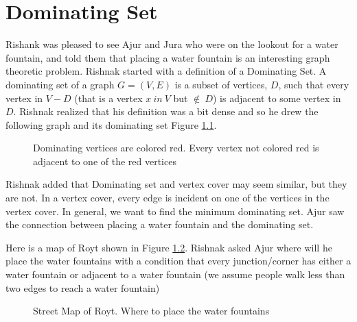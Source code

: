 \chapter{Dominating Set}

Rishank was pleased to see Ajur and Jura who were on the lookout for a water fountain, and told them that placing a water fountain is an interesting graph theoretic problem. Rishnak started with a definition of a Dominating Set. A dominating set of a graph $G=(V,E)$ is a subset of vertices, $D$, such that every vertex in $V-D$ (that is a vertex $x~in ~V $ but $\notin~ D$) is adjacent to some vertex in $D$. Rishnak realized that his definition was a bit dense and so he drew the following graph and its dominating set Figure \ref{18g1}.
\begin{figure}
\begin{center}
\caption{ Dominating vertices are colored red. Every vertex not colored red is adjacent to one of the red vertices}\label{18g1}
\end{center}
\end{figure}

Rishnak added that Dominating set and vertex cover may seem similar, but they are not. In a vertex cover, every edge is incident on one of the vertices in the vertex cover. In general, we want to find the minimum dominating set. Ajur saw the connection between placing a water fountain and the dominating set.

Here is a map of Royt shown in Figure \ref{18g2}. Rishnak asked Ajur where will he place the water fountains with a condition that every junction/corner has either a water fountain or adjacent to a water fountain (we assume people walk less than two edges to reach a water fountain)
\begin{figure}
\begin{center}

\caption{Street Map of Royt. Where to place the water fountains}\label{18g2}
\end{center}
\end{figure}

